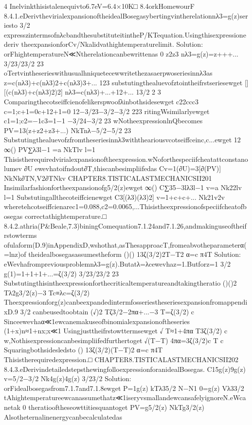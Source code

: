 {{{{{{{{{{{4
Inelvinkthisistalenequivto6.7eV=6.4×10K□
8.4orkHomewourF
8.4.1.eDerivthevirialexpansionoftheidealBosegasybertingvintherelationnλ3=g(z)seriesto
3/2
expresszintermsofnλcbandthesubstituteitintheP/KTequation.Usingthisexpressionederiv
theexpansionforCv/Nkalidvathightemperaturelimit.
Solution:
orFhightemperatureN≪Ntherelationcanbewrittenas
0
z2z3
nλ3=g(z)=z+++...
3/23/23/2
23
oTertvintheserieswithusualhniquetecewwritethezasaerpwoseriesinnλ3as
z=c(nλ3)+c(nλ3)2+c(nλ3)3+...
123
substutingthealuevofztointheifrstseriesewget
[][(c(nλ3)+c(nλ3)2)2]
nλ3=c(nλ3)+...+12+...
13/2
2
3
Comparingthecotseiffcienofelikerspwoofλinbothsidesewget
c22ccc3
c=1;c+1=0c+12+1=0
12−3/23−3/2−3/2
223
ritingWsimilarlyewget
c1=1;c2=−1c3=1−1
−3/24−3/2
23
wNotheexpressionlnQbecomes
PV=13(z+z2+z3+...)
NkTnλ−5/2−5/2
23
Substutingthealuevofzfromtheseriesinnλ3withtheariousvcotseiffceinc,c...ewget
12
∞()
PV∑λ3l−1
=a
NkTlv
l=1
Thisistherequiredvirialexpansionoftheexpression.wNoforthespeciifcheatattconstanolumev
∂U
ewevhatoifndout∂T,thiscanbesimpliifedas
Cv=1(∂U)=3[∂(PV)]
NkNk∂TN,V2∂TNkv
CHAPTER8.TISTICALASTMECHANICSII201
Insimilarfashionfortheexpansionofg5/2(z)ewget
∞()
C∑35−3lλ3l−1
v=a
Nk22lv
l=1
Substutingallthecoteiffcienewget
C3[(λ3)(λ3)2]
v=1+c+c+...
Nk21v2v
wheretehcotseiffcienarec1=0.088,c2=0.0065,...Thisistheexpressionofspeciifcheatofbosegas
correctathightemperature.□
8.4.2.athria(P&Beale,7.3)biningComequation7.1.24and7.1.26,andmakinguseoftheifrstowterms
ofulaform(D.9)inAppendixD,wshothat,asThesapproacT,fromeabvotheparameterα(=lnz)of
theidealbosegasassumestheform
()()
13ζ(3/2)2T−T2
α=c
π4T
Solution:
eWevhafrompreviousproblemnλ3=g(z).Butatλ=λcewevhaz=1.Butforz=1
3/2
g(1)=1+1+1+...=ζ(3/2)
3/23/23/2
23
Substutingthisintheexpressionforthecriticaltemperatureandtakingtheratio
()()2
Tλ2g3/2(z)−3
Tc≡λc=ζ(3/2)
Theexpressionforg(z)canbeexpandedintermfosseriestheseriesexpansionfromappendixD.9
3/2
canbeusedtoobtain
(√)2
Tζ3/2−2πα+...−3
T=ζ(3/2)
c
Sinceewevhaα≪1ewcanemakuseofbinomialexpansionoftheseries
(1+x)n≈1+nx;x≪1
Usingjusttheifrstowttermsewget
√
T≈1+4πα
T3ζ(3/2)
c
w,Nothisexpressioncanbesimpliifedfurthertoget
√(T−T)
4πα=3ζ(3/2)c
T
c
Squaringbothsidesledsto
()
13ζ(3/2)(T−T)2
α=c
π4T
Thisistherequiredexpression.□
CHAPTER8.TISTICALASTMECHANICSII202
8.4.3.eDerivindetailedstepsthewingfolloexpressionforanidealBosegas.
C15g(z)9g(z)
v=5/2−3/2
Nk4g(z)4g(z)
3/23/2
Solution:
orFidealbosegasfrom7.1.7and7.1.8ewget
P=1g(z)
kTλ35/2
N−N1
0=g(z)
Vλ33/2
tAhightemperatureewcanassumethatz≪1iseryvsmallandewcansafelyignoreN.eWcanetak
0
theratiooftheseowttitiesquantoget
PV=g5/2(z)
NkTg3/2(z)
Alsotheternalinenergycanbecalculatedas
}}}}}}}}}}}
